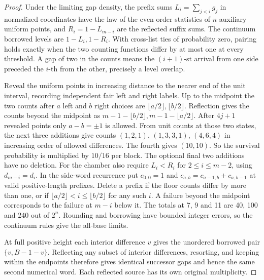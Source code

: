 \documentclass[11pt]{amsart}
\theoremstyle{definition}
\begin{document}
\begin{proof}
Under the limiting gap density, the prefix sums
\(L_i=\sum_{j<i}g_j\) in normalized coordinates have the law
of the even order statistics of \(n\) auxiliary uniform
points, and \(R_i=1-L_{m-i}\) are the reflected suffix sums.
The continuum borrowed levels are \(1-L_i,1-R_i\).
With cross-list ties of probability zero, pairing holds
exactly when the two counting functions differ by at most
one at every threshold. A gap of two in the counts means
the \((i+1)\)-st arrival from one side preceded the \(i\)-th
from the other, precisely a level overlap.

Reveal the uniform points in increasing distance to the
nearer end of the unit interval, recording independent fair
left and right labels. Up to the midpoint the two counts
after \(a\) left and \(b\) right choices are
\(\lfloor a/2\rfloor,\lfloor b/2\rfloor\).
Reflection gives the counts beyond the midpoint as
\(m-1-\lfloor b/2\rfloor,m-1-\lfloor a/2\rfloor\).
After \(4j+1\) revealed points only \(a-b=\pm1\) is
allowed. From unit counts at those two states, the next
three additions give counts \((1,2,1)\), \((1,3,3,1)\), \((4,6,4)\)
in increasing order of allowed differences. The fourth
gives \((10,10)\). So the survival probability is multiplied
by \(10/16\) per block. The optional final two additions
have no deletion.
For the chamber also require \(L_i<R_i\) for
\(2\le i\le m-2\), using \(d_{m-i}=d_i\).
In the side-word recurrence put \(c_{0,0}=1\) and
\(c_{a,b}=c_{a-1,b}+c_{a,b-1}\) at valid positive-length
prefixes. Delete a prefix if the floor counts differ by more
than one, or if
\(\lfloor a/2\rfloor<i\le\lfloor b/2\rfloor\) for any such
\(i\). A failure beyond the midpoint corresponds to the
failure at \(m-i\) below it. The totals at 7, 9 and 11 are
40, 100 and 240 out of \(2^n\). Rounding and borrowing
have bounded integer errors, so the continuum rules give
the all-base limits.

At full positive height each interior difference \(v\) gives
the unordered borrowed pair \(\{v,B-1-v\}\).
Reflecting any subset of interior differences, resorting,
and keeping within the endpoints therefore gives identical
successor gaps and hence the same second numerical word.
Each reflected source has its own original multiplicity.


\end{proof}
\end{document}
